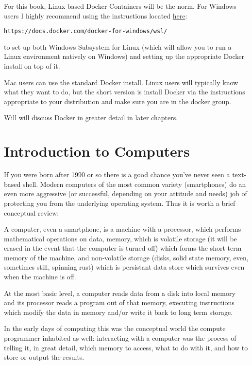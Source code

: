 \documentclass[11pt]{article}
\begin{document}
For this book, Linux based Docker Containers will be the norm. For
Windows users I highly recommend using the instructions located \href{https://docs.docker.com/docker-for-windows/wsl/}{here}:

\begin{verbatim}
https://docs.docker.com/docker-for-windows/wsl/
\end{verbatim}

to set up both Windows Subsystem for Linux (which will allow you to
run a Linux environment natively on Windows) and setting up the
appropriate Docker install on top of it. 

Mac users can use the standard Docker install. Linux users will
typically know what they want to do, but the short version is install
Docker via the instructions appropriate to your distribution and make
sure you are in the docker group. 

Will will discuss Docker in greater detail in later chapters.

\section{Introduction to Computers}
\label{sec:org6a25a62}

If you were born after 1990 or so there is a good chance you've never
seen a text-based shell. Modern computers of the most common variety
(smartphones) do an even more aggressive (or successful, depending on
your attitude and needs) job of protecting you from the underlying
operating system. Thus it is worth a brief conceptual review:

A computer, even a smartphone, is a machine with a processor, which
performs mathematical operations on data, memory, which is volatile
storage (it will be erased in the event that the computer is turned
off) which forms the short term memory of the machine, and
non-volatile storage (disks, solid state memory, even, sometimes
still, spinning rust) which is persistant data store which survives
even when the machine is off.

At the most basic level, a computer reads data from a disk into local
memory and its processor reads a program out of that memory, executing
instructions which modify the data in memory and/or write it back to
long term storage.

In the early days of computing this was the conceptual world the
compute programmer inhabited as well: interacting with a computer was
the process of telling it, in great detail, which memory to access,
what to do with it, and how to store or output the results.
\end{document}
